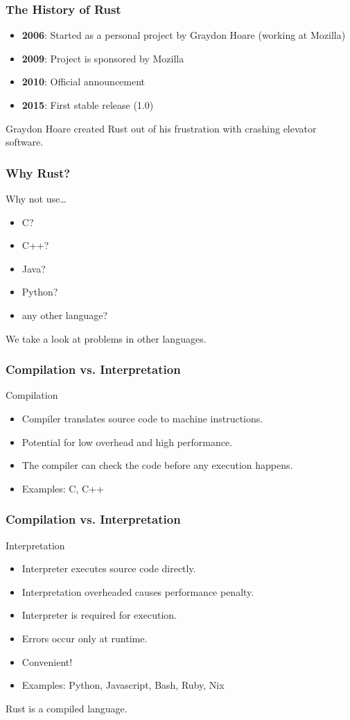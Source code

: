 \begin{frame}[fragile]
    \frametitle{The History of Rust}
    \begin{itemize}
        \item \textbf{2006}: Started as a personal project by Graydon Hoare (working at Mozilla)
        \item \textbf{2009}: Project is sponsored by Mozilla
        \item \textbf{2010}: Official announcement
        \item \textbf{2015}: First stable release (1.0)
    \end{itemize}
    \pause
    \vfill
    Graydon Hoare created Rust out of his frustration with crashing elevator software.
\end{frame}

\begin{frame}
    \frametitle{Why Rust?}
    \pause
    Why not use\ldots
    \vfill
    \begin{itemize}
        \pause
        \item C?
        \pause
        \item C++?
        \pause
        \item Java?
        \pause
        \item Python?
        \pause
        \item any other language?
    \end{itemize}
    \pause
    \vfill
    We take a look at problems in other languages.
\end{frame}

\begin{frame}
    \frametitle{Compilation vs. Interpretation}
    Compilation
    \begin{itemize}
        \item Compiler translates source code to machine instructions.
        \item Potential for low overhead and high performance.
        \item The compiler can check the code before any execution happens.
        \item Examples: C, C++
    \end{itemize}
\end{frame}

\begin{frame}
    \frametitle{Compilation vs. Interpretation}
    Interpretation
    \begin{itemize}
        \item Interpreter executes source code directly.
        \pause
        \item Interpretation overheaded causes performance penalty.
        \item Interpreter is required for execution.
        \item Errors occur only at runtime.
        \pause
        \item Convenient!
        \item Examples: Python, Javascript, Bash, Ruby, Nix
    \end{itemize}
    \pause
    \vfill
    Rust is a compiled language.
\end{frame}

